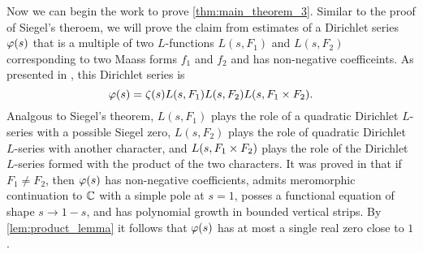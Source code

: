 \documentclass[12pt,reqno,oneside]{amsart}
\begin{document}
    Now we can begin the work to prove \cref{thm:main_theorem_3}. Similar to the proof of Siegel's theroem, we will prove the claim from estimates of a Dirichlet series $\varphi(s)$ that is a multiple of two $L$-functions $L(s,F_{1})$ and $L(s,F_{2})$ corresponding to two Maass forms $f_{1}$ and $f_{2}$ and has non-negative coefficeints. As presented in \cite{HL}, this Dirichlet series is
    \[
        \varphi(s) = \zeta(s)L(s,F_{1})L(s,F_{2})L(s,F_{1} \times F_{2}).
    \]
    Analgous to Siegel's theorem, $L(s,F_{1})$ plays the role of a quadratic Dirichlet $L$-series with a possible Siegel zero, $L(s,F_{2})$ plays the role of quadratic Dirichlet $L$-series with another character, and $L(s,F_{1} \times F_{2})$ plays the role of the Dirichlet $L$-series formed with the product of the two characters. It was proved in \cite{HL} that if $F_{1} \neq F_{2}$, then $\varphi(s)$ has non-negative coefficients, admits meromorphic continuation to $\mathbb{C}$ with a simple pole at $s = 1$, posses a functional equation of shape $s \to 1-s$, and has polynomial growth in bounded vertical strips. By \cref{lem:product_lemma} it follows that $\varphi(s)$ has at most a single real zero close to $1$.
    
\end{document}
